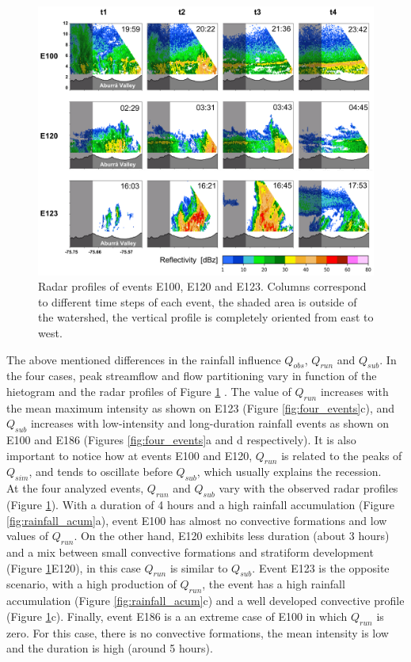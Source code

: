 \documentclass[preprint,12pt]{elsarticle}
\begin{document}
\begin{figure}[!h]
    \centering
    \includegraphics[width=14cm]{Figuras/Perfiles_Radar.png}
    \caption{Radar profiles of events E100, E120 and E123. Columns correspond to 
    different time steps of each event, the shaded area is outside of the watershed, the vertical profile is completely oriented from east to west.}
    \label{fig:radar_profiles}
\end{figure}

The above mentioned differences in the rainfall influence $Q_{obs}$, $Q_{run}$ and $Q_{sub}$.  In the four cases, peak streamflow and flow partitioning vary in function of the hietogram and the radar profiles of Figure  \ref{fig:radar_profiles} .  The value of $Q_{run}$ increases with the mean maximum intensity as shown on E123 (Figure \ref{fig:four_events}c), and $Q_{sub}$ increases with low-intensity and long-duration rainfall events as shown on  E100 and E186 (Figures \ref{fig:four_events}a and d respectively).  It is also important to notice how at events E100 and E120, $Q_{run}$ is related to the peaks of $Q_{sim}$, and tends to oscillate before $Q_{sub}$, which usually explains the recession. \\

At the four analyzed events,  $Q_{run}$ and $Q_{sub}$ vary with the observed radar profiles (Figure \ref{fig:radar_profiles}). With a duration of 4 hours and a high rainfall accumulation (Figure \ref{fig:rainfall_acum}a), event E100 has almost no convective formations and low values of $Q_{run}$. On the other hand, E120 exhibits less duration (about 3 hours) and a mix between small convective formations and stratiform development (Figure \ref{fig:radar_profiles}E120), in this case  $Q_{run}$ is similar to $Q_{sub}$.  Event E123 is the opposite scenario, with a high production of $Q_{run}$, the event has a high rainfall accumulation (Figure \ref{fig:rainfall_acum}c) and a well developed convective profile (Figure \ref{fig:radar_profiles}c). Finally, event E186 is a an extreme case of E100 in which $Q_{run}$ is zero. For this case, there is no convective formations, the mean intensity is low and the duration is high (around 5 hours). 
\end{document}
